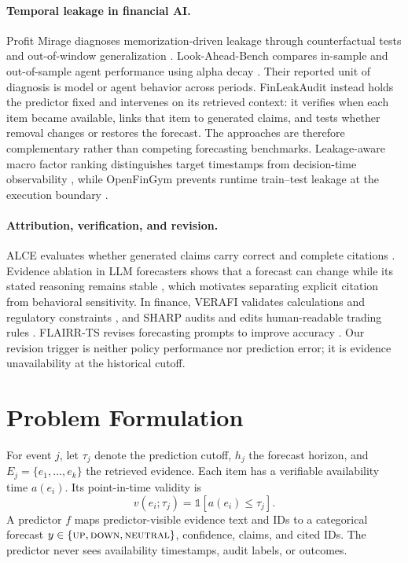 \documentclass[10pt,twocolumn]{article}
\newcommand{\system}{FinLeakAudit}
\newcommand{\up}{\textsc{up}}
\newcommand{\down}{\textsc{down}}
\newcommand{\neutral}{\textsc{neutral}}
\begin{document}
\paragraph{Temporal leakage in financial AI.}
Profit Mirage diagnoses memorization-driven leakage through counterfactual tests and
out-of-window generalization \cite{li2025profitmirage}. Look-Ahead-Bench compares
in-sample and out-of-sample agent performance using alpha decay
\cite{benhenda2026lookahead}. Their reported unit of diagnosis is model or agent
behavior across periods. \system{} instead holds the predictor fixed and intervenes
on its retrieved context: it verifies when each item became available, links that
item to generated claims, and tests whether removal changes or restores the forecast.
The approaches are therefore complementary rather than competing forecasting
benchmarks. Leakage-aware macro factor ranking distinguishes target timestamps from
decision-time observability \cite{guan2026leakageaware}, while OpenFinGym prevents
runtime train--test leakage at the execution boundary \cite{zhang2026openfingym}.

\paragraph{Attribution, verification, and revision.}
ALCE evaluates whether generated claims carry correct and complete citations
\cite{gao2023alce}. Evidence ablation in LLM forecasters shows that a forecast can
change while its stated reasoning remains stable \cite{sarfati2026forecasters}, which
motivates separating explicit citation from behavioral sensitivity. In finance,
VERAFI validates calculations and regulatory constraints \cite{akinfaderin2025verafi},
and SHARP audits and edits human-readable trading rules \cite{chen2026sharp}.
FLAIRR-TS revises forecasting prompts to improve accuracy
\cite{jalori2025flairr}. Our revision trigger is neither policy performance nor
prediction error; it is evidence unavailability at the historical cutoff.

\section{Problem Formulation}

For event $j$, let $\tau_j$ denote the prediction cutoff, $h_j$ the forecast
horizon, and $E_j=\{e_1,\ldots,e_k\}$ the retrieved evidence. Each item has a
verifiable availability time $a(e_i)$. Its point-in-time validity is
\begin{equation}
  v(e_i;\tau_j)=\mathbb{1}[a(e_i)\leq\tau_j].
\end{equation}
A predictor $f$ maps predictor-visible evidence text and IDs to a categorical
forecast $y\in\{\up,\down,\neutral\}$, confidence, claims, and cited IDs. The
predictor never sees availability timestamps, audit labels, or outcomes.
\end{document}
